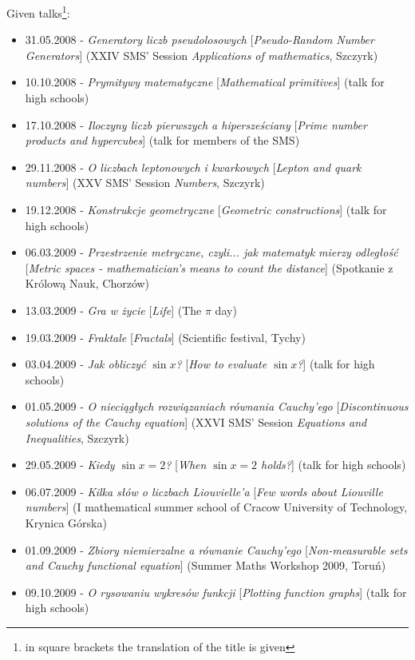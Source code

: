 \noindent Given talks\footnote{in square brackets the translation of the title is given}:
\begin{itemize}
  \item 31.05.2008 - \textsl{Generatory liczb pseudolosowych} [\textsl{Pseudo-Random Number Generators}] (XXIV SMS' Session \textsl{Applications of mathematics}, Szczyrk)
  \item 10.10.2008 - \textsl{Prymitywy matematyczne} [\textsl{Mathematical primitives}] (talk for high schools)
  \item 17.10.2008 - \textsl{Iloczyny liczb pierwszych a hipersześciany} [\textsl{Prime number products and hypercubes}] (talk for members of the SMS)
  \item 29.11.2008 - \textsl{O liczbach leptonowych i kwarkowych} [\textsl{Lepton and quark numbers}] (XXV SMS' Session \textsl{Numbers}, Szczyrk)
  \item 19.12.2008 - \textsl{Konstrukcje geometryczne} [\textsl{Geometric constructions}] (talk for high schools)
  \item 06.03.2009 - \textsl{Przestrzenie metryczne, czyli... jak matematyk mierzy odległość} [\textsl{Metric spaces - mathematician's means to count the distance}] (Spotkanie z Królową Nauk, Chorzów)
  \item 13.03.2009 - \textsl{Gra w życie} [\textsl{Life}] (The $\pi$ day)
  \item 19.03.2009 - \textsl{Fraktale} [\textsl{Fractals}] (Scientific festival, Tychy)
  \item 03.04.2009 - \textsl{Jak obliczyć $\sin x$?} [\textsl{How to evaluate $\sin x$?}] (talk for high schools)
  \item 01.05.2009 - \textsl{O nieciągłych rozwiązaniach równania Cauchy'ego} [\textsl{Discontinuous solutions of the Cauchy equation}] (XXVI SMS' Session \textsl{Equations and Inequalities}, Szczyrk)
  \item 29.05.2009 - \textsl{Kiedy $\sin x=2$?} [\textsl{When $\sin x=2$ holds?}] (talk for high schools)
  \item 06.07.2009 - \textsl{Kilka słów o liczbach Liouvielle'a} [\textsl{Few words about Liouville numbers}] (I mathematical summer school of Cracow University of Technology, Krynica Górska)
  \item 01.09.2009 - \textsl{Zbiory niemierzalne a równanie Cauchy'ego} [\textsl{Non-measurable sets and Cauchy functional equation}] (Summer Maths Workshop 2009, Toruń)
  \item 09.10.2009 - \textsl{O rysowaniu wykresów funkcji} [\textsl{Plotting function graphs}] (talk for high schools)

\end{itemize}
